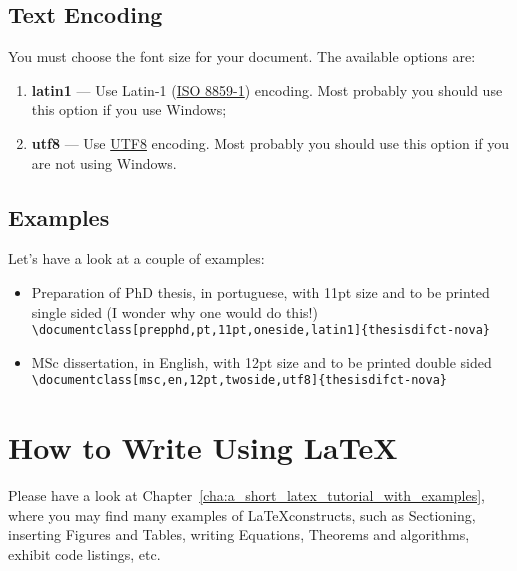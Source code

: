 \subsection{Text Encoding}
\label{ssec:text_encoding}

You must choose the font size for your document. The available options are:
\begin{enumerate}
  \item \textbf{latin1} --- Use Latin-1 (\href{http://en.wikipedia.org/wiki/ISO/IEC_8859-1}{ISO 8859-1}) encoding.  Most probably you should use this option if you use Windows;
  \item \textbf{utf8} --- Use \href{http://en.wikipedia.org/wiki/UTF-8}{UTF8} encoding.    Most probably you should use this option if you are not using Windows.
\end{enumerate}

\subsection{Examples}
\label{ssec:examples}

Let's have a look at a couple of examples:

\begin{itemize}
  \item Preparation of PhD thesis, in portuguese, with 11pt size and to be printed single sided (I wonder why one would do this!)\\
        \verb!\documentclass[prepphd,pt,11pt,oneside,latin1]{thesisdifct-nova}!
  \item MSc dissertation, in English, with 12pt size and to be printed double sided\\
        \verb!\documentclass[msc,en,12pt,twoside,utf8]{thesisdifct-nova}!
\end{itemize}

\section{How to Write Using \LaTeX}
\label{sec:how_to_write_using_latex}

Please have a look at Chapter~\ref{cha:a_short_latex_tutorial_with_examples}, where you may find many examples of \LaTeX constructs, such as Sectioning, inserting Figures and Tables, writing Equations, Theorems and algorithms, exhibit code listings, etc.


